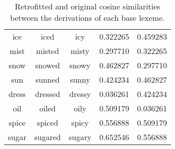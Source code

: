 \documentclass[12pt]{article}
\begin{document}
\begin{table}[p]
\begin{center}
\begin{tabular}{||c c c c c||}
            ice & iced & icy & 0.322265 & 0.459283 \\
            mist & misted & misty & 0.297710 & 0.322265 \\
            snow & snowed & snowy & 0.462827 & 0.297710 \\
            sun & sunned & sunny & 0.424234 & 0.462827 \\
            dress & dressed & dressy & 0.036261 & 0.424234 \\
            oil & oiled & oily & 0.509179 & 0.036261 \\
            spice & spiced & spicy & 0.556888 & 0.509179 \\
            sugar & sugared & sugary & 0.652546 & 0.556888 \\
            \hline    
                
            \end{tabular}
        \end{center}
        \caption{Retrofitted and original cosine similarities between the derivations of each base lexeme.}
        \end{table}
\end{document}
